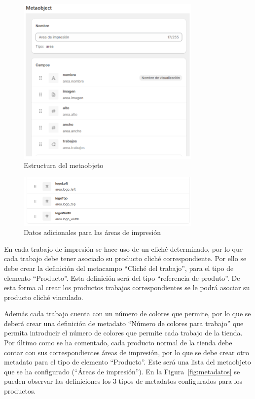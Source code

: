 \documentclass[12pt]{article}
\begin{document}
\begin{figure}[ht]
    \centering
    \includegraphics[width=0.8\textwidth]{imagenesUS2/creacionMetaobjeto.png}
    \caption{\label{fig:metaobjeto}Estructura del metaobjeto}
    \vspace{\fill}
\end{figure}

\begin{figure}[ht]
    \centering
    \includegraphics[width=0.8\textwidth]{imagenesUS2/elementosMetaobjectAdicionales.png}
    \caption{\label{fig:metaobjetoAdicional}Datos adicionales para las áreas de impresión}
    \vspace{\fill}
\end{figure}

En cada trabajo de impresión se hace uso de un cliché determinado, por lo que cada trabajo debe tener asociado su producto cliché correspondiente. Por ello se debe 
crear la definición del metacampo ``Cliché del trabajo'', para el tipo de elemento ``Producto''. Esta definición será del tipo ``referencia de produto''. De esta forma al crear los productos trabajos correspondientes se le podrá asociar su producto cliché vinculado.

Además cada trabajo cuenta con un número de colores que permite, por lo que se deberá crear una definición de metadato ``Número de colores para trabajo'' que permita
introducir el número de colores que permite cada trabajo de la tienda. Por último como se ha comentado, cada producto normal de la tienda debe contar con sus correspondientes áreas de impresión, por lo que se debe crear otro metadato para el tipo de elemento ``Producto''. Este será una 
lista del metaobjeto que se ha configurado (``Áreas de impresión''). En la Figura~\ref{fig:metadatos} se pueden observar las definiciones los 3 tipos de metadatos configurados para los productos.
\end{document}
